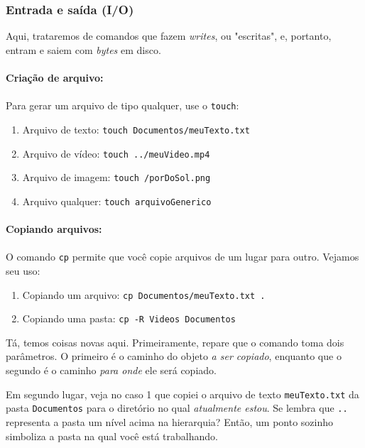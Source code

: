 \documentclass{article}
\begin{document}
	\subsubsection{Entrada e saída (I/O)}

	Aqui, trataremos de comandos que fazem \textit{writes}, ou "escritas", e, portanto, entram e saiem com \textit{bytes} em disco. 

	\paragraph{Criação de arquivo:} 
	\paragraph{}
	Para gerar um arquivo de tipo qualquer, use o \texttt{touch}: 
	
	\begin{enumerate} 
		\item{Arquivo de texto: \texttt{touch Documentos/meuTexto.txt}} 
		\item{Arquivo de vídeo: \texttt{touch ../meuVideo.mp4}}
		\item{Arquivo de imagem: \texttt{touch /porDoSol.png}}
		\item{Arquivo qualquer: \texttt{touch arquivoGenerico}}
	\end{enumerate}

	\paragraph{Copiando arquivos:} 
	\paragraph{} 
	O comando \texttt{cp} permite que você copie arquivos de um lugar para outro. Vejamos seu uso: 
	\begin{enumerate} 
		\item{Copiando um arquivo: \texttt{cp Documentos/meuTexto.txt .}}
		\item{Copiando uma pasta: \texttt{cp -R Videos Documentos}}
	\end{enumerate} 


	Tá, temos coisas novas aqui. Primeiramente, repare que o comando toma dois parâmetros. O primeiro é 
	o caminho do objeto \textit{a ser copiado}, enquanto que o segundo é o caminho \textit{para onde} ele será copiado. 
	
	Em segundo lugar, veja no caso 1 que copiei o arquivo de texto \texttt{meuTexto.txt} da pasta \texttt{Documentos} 
	para o diretório no qual \textit{atualmente estou}. Se lembra que \texttt{..} representa a pasta um nível acima
	na hierarquia? Então, um ponto sozinho simboliza a pasta na qual você está trabalhando. 
	
\end{document}
